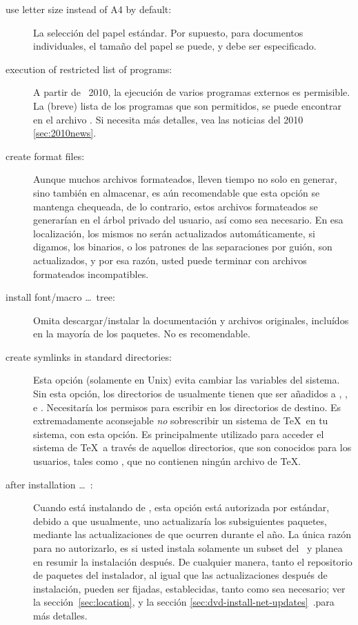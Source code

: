 \documentclass{article}
\begin{document}
\begin{description}
\item[use letter size instead of A4 by default:] La selección del
	papel estándar. Por supuesto, para documentos individuales, el
	tamaño del papel se puede, y debe ser especificado.  

\item[execution of restricted list of programs:] A partir de \TL\
	2010, la ejecución de varios programas externos es permisible.
	La (breve) lista de los programas que son permitidos, se puede
	encontrar en el archivo . Si necesita más
	detalles, vea las noticias del 2010 \ref{sec:2010news}.

\item[create format files:] Aunque muchos archivos formateados, lleven
	tiempo no solo en generar, sino también en almacenar, es aún
	recomendable que esta opción se mantenga chequeada, de lo
	contrario, estos archivos formateados se generarían en el
	árbol privado del usuario, así como sea necesario. En esa
	localización, los mismos no serán actualizados
	automáticamente, si digamos, los binarios, o los patrones de
	las separaciones por guión, son actualizados, y por esa razón,
	usted puede terminar con archivos formateados incompatibles. 

\item[install font/macro \ldots\ tree:] Omita descargar/instalar la
	documentación y archivos originales, incluídos en la mayoría de
	los paquetes. No es recomendable. 

\item[create symlinks in standard directories:] Esta opción (solamente
	en Unix) evita cambiar las variables del sistema. Sin esta
	opción, los directorios de \TL{} usualmente tienen que ser
	añadidos a , , e
	. Necesitaría los permisos para escribir en
	los directorios de destino. Es extremadamente aconsejable
	\emph{no} sobrescribir un sistema de \TeX\ en tu sistema, con
	esta opción. Es principalmente utilizado para acceder el
	sistema de \TeX\ a través de aquellos directorios, que son
	conocidos para los usuarios, tales como
	, que no contienen ningún archivo de
	\TeX.

\item[after installation \ldots\ \CTAN:] Cuando está instalando de
	\DVD, esta opción está autorizada por estándar, debido a que
	usualmente, uno actualizaría los subsiguientes paquetes,
	mediante las actualizaciones de \CTAN que ocurren durante el
	año. La única razón para no autorizarlo, es si usted instala
	solamente un subset del \DVD\ y planea en resumir la
	instalación después. De cualquier manera, tanto el repositorio
	de paquetes del instalador, al igual que las actualizaciones
	después de instalación, pueden ser fijadas, establecidas,
	tanto como sea necesario; ver la sección~\ref{sec:location}, y
	la sección \ref{sec:dvd-install-net-updates}~.para más detalles. 
	\end{description}
\end{document}
